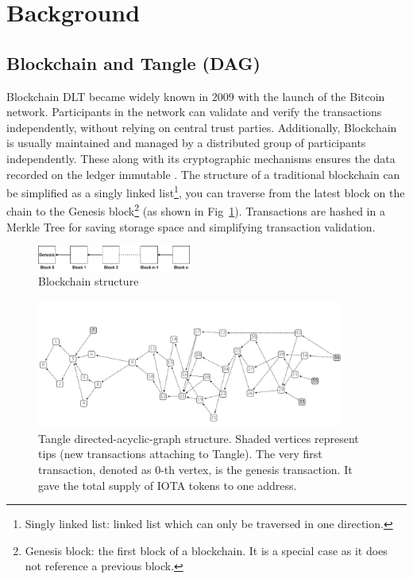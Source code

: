 \section{Background}
\label{sec:background}

\subsection{Blockchain and Tangle (DAG)}
Blockchain DLT became widely known in 2009 with the launch of the Bitcoin network.
Participants in the network can validate and verify the transactions independently, without relying on central trust parties.
Additionally, Blockchain is usually maintained and managed by a distributed group of participants independently.
These along with its cryptographic mechanisms ensures the data recorded on the ledger immutable \cite{Yaga2018BlockchainTO}.
The structure of a traditional blockchain can be simplified as a singly linked list\footnote{Singly linked list: linked list which can only be traversed in one direction.},
you can traverse from the latest block on the chain to the Genesis block\footnote{Genesis block: the first block of a blockchain. It is a special case as it does not reference a previous block.} (as shown in Fig~\ref{fig:blockchain_structure}).
Transactions are hashed in a Merkle Tree \cite{merkle1980protocols} for saving storage space and simplifying transaction validation.


\begin{figure}[h]
    \includegraphics[width=0.45\textwidth,trim={-2cm -0.5cm 0 -0.5cm},clip]{figs/blockchain_structure.pdf}
    \caption{Blockchain structure}
    \label{fig:blockchain_structure}
\end{figure}

\begin{figure}[t]
    \centering
    \includegraphics[width=0.9\textwidth,trim={0 0 0 2cm},clip]{figs/tangle_structure.png}
    \caption{Tangle directed-acyclic-graph structure. Shaded vertices represent tips (new transactions attaching to Tangle). The very first transaction, denoted as 0-th vertex, is the genesis transaction. It gave the total supply of IOTA tokens to one address.}
    \label{fig:tangle_structure}
\end{figure}

